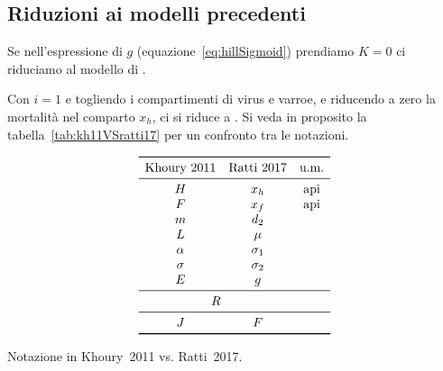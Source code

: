 \subsection{Riduzioni ai modelli precedenti}

Se nell'espressione di $g$ (equazione~\eqref{eq:hillSigmoid}) prendiamo $K=0$ ci riduciamo al modello di \cite{sumMar04}.

Con $i=1$ e togliendo i compartimenti di virus e varroe, e riducendo a zero la mortalità nel
comparto $x_h$, ci si riduce a \cite{khoury2011}. Si veda in proposito la tabella~\ref{tab:kh11VSratti17} per
un confronto tra le notazioni.

\begin{table}[pbh]
    $$\begin{array}{ccc}
        \toprule
        \text{Khoury~2011}
        & \text{Ratti~2017}
        & \text{u.m.} \\
        \midrule
        H & x_h & \text{api} \\
        F & x_f & \text{api} \\
        m & d_2 & \\ %
        L & \mu & \\
        \alpha & \sigma_1 & \\
        \sigma & \sigma_2 & \\
        E & g & \\
        \midrule
        \multicolumn{2}{c}{R} & \\
        \midrule
        J & F & \\
        \bottomrule
    \end{array}$$
    \caption{Notazione in Khoury~2011 vs. Ratti~2017.}
    \label{tab:kh11VSratti17}
\end{table}

